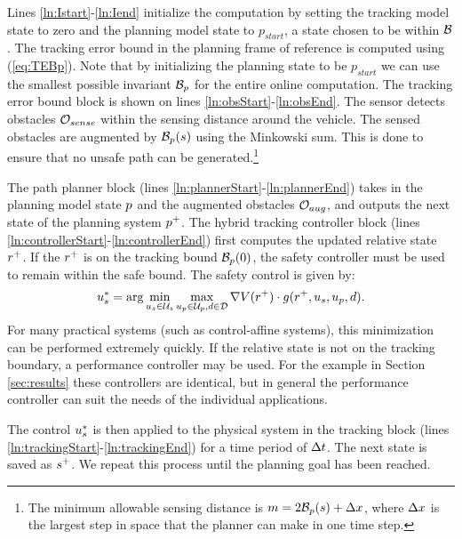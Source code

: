 Lines \ref{ln:Istart}-\ref{ln:Iend} initialize the computation by setting the tracking model state to zero and the planning model state to $p_{start}$, a state chosen to be within $\mathcal B$. The tracking error bound in the planning frame of reference is computed using (\ref{eq:TEBp}). Note that by initializing the planning state to be $p_{start}$ we can use the smallest possible invariant $\mathcal B_p$ for the entire online computation. The tracking error bound block is shown on lines \ref{ln:obsStart}-\ref{ln:obsEnd}. The sensor detects obstacles $\mathcal{O}_{sense}$ within the sensing distance around the vehicle. The sensed obstacles are augmented by $\mathcal B_p(s)$ using the Minkowski sum. This is done to ensure that no unsafe path can be generated.\footnote{The minimum allowable sensing distance is $m = 2\mathcal B_p(s) + \Delta x$, where $\Delta x$ is the largest step in space that the planner can make in one time step.}


 The path planner block (lines \ref{ln:plannerStart}-\ref{ln:plannerEnd}) takes in the planning model state $p$ and the augmented obstacles $\mathcal{O}_{aug}$, and outputs the next state of the planning system $p^+$. The hybrid tracking controller block (lines \ref{ln:controllerStart}-\ref{ln:controllerEnd}) first computes the updated relative state $r^+$. If the $r^+$ is on the tracking bound $\mathcal B_p(0)$, the safety controller must be used to remain within the safe bound. The safety control is given by:
\begin{equation}
  \label{eq:opt_ctrl}
	u_s^* = \arg\min_{u_s\in\mathcal{U}_s} \max_{u_p\in\mathcal{U}_p, d\in\mathcal{D}} \nabla V(r^+) \cdot g(r^+,u_s,u_p,d).
\end{equation}
For many practical systems (such as control-affine systems), this minimization can be performed extremely quickly. If the relative state is not on the tracking boundary, a performance controller may be used. For the example in Section \ref{sec:results} these controllers are identical, but in general the performance controller can suit the needs of the individual applications.

The control $u_s^*$ is then applied to the physical system in the tracking block (lines \ref{ln:trackingStart}-\ref{ln:trackingEnd}) for a time period of $\Delta t$. The next state is saved as $s^+$. We repeat this process until the planning goal has been reached.